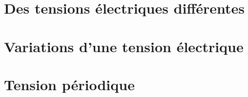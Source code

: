 \documentclass[12pt,a4paper]{article}
\date{}
\title{}
\begin{document}
	
	

\section{Des tensions électriques différentes}

%







\section{Variations d'une tension électrique}

%



%	
%	


\section{Tension périodique}





\end{document}
